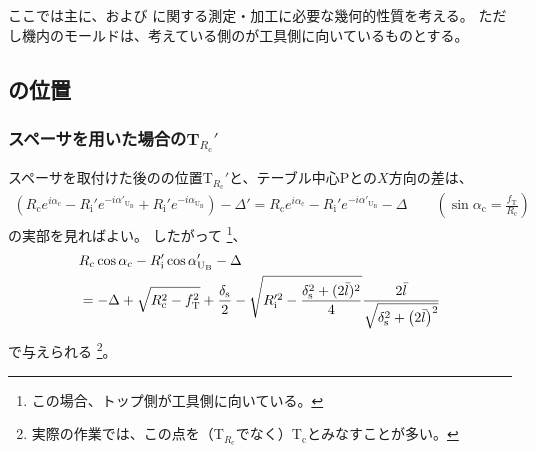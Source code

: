 

ここでは主に、\textbf{\EndFacecut}および\textbf{\OuterDiameter} に関する測定・加工に必要な幾何的性質を考える。
ただし機内のモールドは、考えている側の\EndFace が工具側に向いているものとする。



\modHeadsection{\TopEndFace}


\subsection{\TopCurvatureCenter の位置}

\subsubsection{スペーサを用いた場合のT\texorpdfstring{$_{R_\mathrm c}'$}{Rc'}}
スペーサを取付けた後の\TopCurvatureCenter の位置T$_{R_\mathrm c}'$と、テーブル中心Pとの$X$方向の差は、
\begin{align*}
  \left(
    R_\mathrm ce^{i\alpha_\mathrm c}
    -R_\mathrm i'e^{-i\alpha'_{\mathrm U_\mathrm B}}
    +R_\mathrm i'e^{-i\alpha_{\mathrm U_\mathrm B}}
  \right)
  -\Delta'
  = R_\mathrm ce^{i\alpha_\mathrm c}-R_\mathrm i'e^{-i\alpha'_{\mathrm U_\mathrm B}}-\Delta \qquad
    \left(\sin\alpha_\mathrm c = \frac{f_\mathrm T}{R_\mathrm c}\right)
\end{align*}
の実部を見ればよい。
したがって
\footnote{この場合、トップ側が工具側に向いている。}、
\begin{align}
  \notag
  &  R_\mathrm c\cos\alpha_\mathrm c-R_\mathrm i'\cos\alpha'_{\mathrm U_\mathrm B}-\Delta\\
  &= -\Delta+\sqrt{R_\mathrm c^2-f_\mathrm T^2}+\frac{\delta_\mathrm s}2
     -\sqrt{R_\mathrm i'^2-\frac{\delta_\mathrm s^2+(2\bar l)^2}4}
      \frac{2\bar l}{\sqrt{\delta_\mathrm s^2+\left(2\bar l\right)^2}}
     \label{eq:spacerTRc}
\end{align}
で与えられる
\footnote{実際の作業では、この点を（\TopCurvatureCenter T$_{R_\mathrm c}\!$でなく）\OutcutCenter T$_\mathrm c$とみなすことが多い。}。


